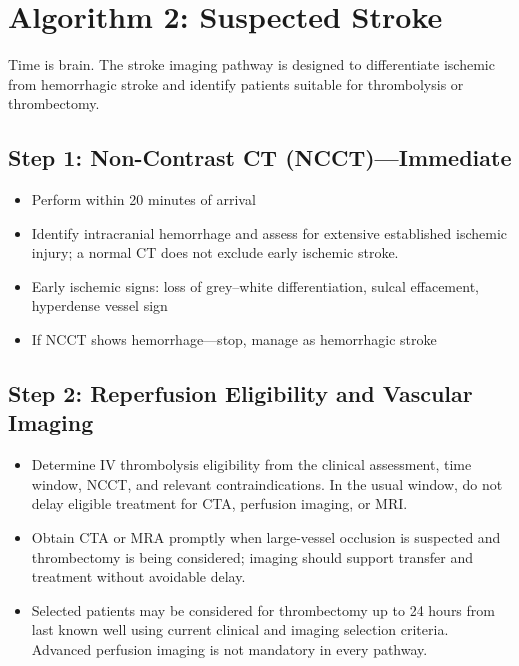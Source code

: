 \section{Algorithm 2: Suspected Stroke}

Time is brain. The stroke imaging pathway is designed to differentiate ischemic from hemorrhagic stroke and identify patients suitable for thrombolysis or thrombectomy.

\subsection{Step 1: Non-Contrast CT (NCCT)---Immediate}
\begin{itemize}
    \item Perform within 20 minutes of arrival
    \item Identify intracranial hemorrhage and assess for extensive established ischemic injury; a normal CT does not exclude early ischemic stroke.
    \item Early ischemic signs: loss of grey--white differentiation, sulcal effacement, hyperdense vessel sign
    \item If NCCT shows hemorrhage---stop, manage as hemorrhagic stroke
\end{itemize}

\subsection{Step 2: Reperfusion Eligibility and Vascular Imaging}
\begin{itemize}
    \item Determine IV thrombolysis eligibility from the clinical assessment, time window, NCCT, and relevant contraindications. In the usual window, do not delay eligible treatment for CTA, perfusion imaging, or MRI.
    \item Obtain CTA or MRA promptly when large-vessel occlusion is suspected and thrombectomy is being considered; imaging should support transfer and treatment without avoidable delay.
    \item Selected patients may be considered for thrombectomy up to 24 hours from last known well using current clinical and imaging selection criteria. Advanced perfusion imaging is not mandatory in every pathway.
\end{itemize}

